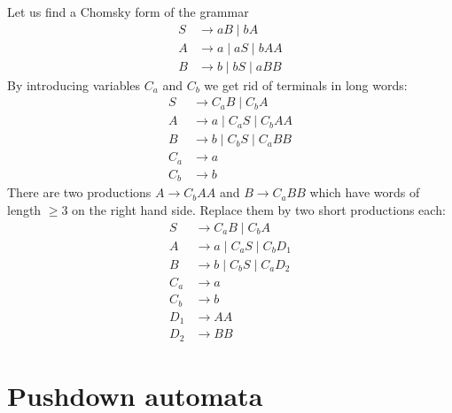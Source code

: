 \begin{page}
\setcounter{section}{5}
\setcounter{subsection}{2}
\setcounter{dfn}{11}
\label{portion:1241}

\begin{exl}
Let us find a Chomsky form of the grammar
\begin{align*}
S &\to aB \mid bA\\
A &\to a \mid aS \mid bAA\\
B &\to b \mid bS \mid aBB
\end{align*}
By introducing variables $C_a$ and $C_b$ we get rid of terminals in long words:
\begin{align*}
S &\to C_aB \mid C_bA\\
A &\to a \mid C_aS \mid C_bAA\\
B &\to b \mid C_bS \mid C_aBB\\
C_a &\to a\\
C_b &\to b
\end{align*}
There are two productions $A \to C_bAA$ and $B \to C_aBB$ which have words of length $\ge 3$ on the right hand side.
Replace them by two short productions each:
\begin{align*}
S &\to C_aB \mid C_bA\\
A &\to a \mid C_aS \mid C_bD_1\\
B &\to b \mid C_bS \mid C_aD_2\\
C_a &\to a\\
C_b &\to b\\
D_1 &\to AA\\
D_2 &\to BB
\end{align*}
\end{exl}

\end{page}

\begin{page}
\setcounter{section}{6}
\setcounter{subsection}{1}
\setcounter{dfn}{0}
\label{portion:1244}

\section{Pushdown automata}

\end{page}

